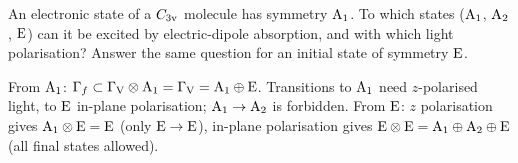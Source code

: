 \begin{exercise}\label{ex:4:dipole}
An electronic state of a $C_{3\mathrm{v}}$ molecule has symmetry $\mathrm{A}_1$. To which
states ($\mathrm{A}_1$, $\mathrm{A}_2$, $\mathrm{E}$) can it be excited by electric-dipole
absorption, and with which light polarisation? Answer the same question for an
initial state of symmetry $\mathrm{E}$.
\end{exercise}

\begin{solution}
From $\mathrm{A}_1$: $\Gamma_f\subset\Gamma_{\mathrm{V}}\otimes\mathrm{A}_1=\Gamma_{\mathrm{V}}=\mathrm{A}_1\oplus\mathrm{E}$. Transitions to
$\mathrm{A}_1$ need $z$-polarised light, to $\mathrm{E}$ in-plane polarisation; $\mathrm{A}_1\to\mathrm{A}_2$ is
forbidden. From $\mathrm{E}$: $z$ polarisation gives $\mathrm{A}_1\otimes\mathrm{E}=\mathrm{E}$ (only
$\mathrm{E}\to\mathrm{E}$), in-plane polarisation gives $\mathrm{E}\otimes\mathrm{E}=\mathrm{A}_1\oplus\mathrm{A}_2\oplus\mathrm{E}$
(all final states allowed).
\end{solution}
